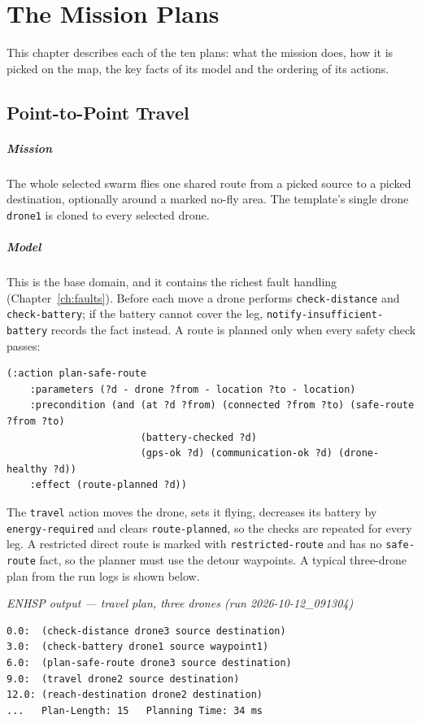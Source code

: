 \documentclass[11pt,a4paper,oneside]{report}
\newcommand{\code}[1]{\texttt{#1}}
\newcommand{\recordlabel}[1]{\par\smallskip\noindent\hspace*{1.2em}\textit{#1}\par}
\begin{document}
\chapter{The Mission Plans}\label{ch:plans}
This chapter describes each of the ten plans: what the mission does, how it is picked on the map,
the key facts of its model and the ordering of its actions.

\section{Point-to-Point Travel}
\paragraph{Mission}
The whole selected swarm flies one shared route from a picked source to a picked destination,
optionally around a marked no-fly area. The template's single drone \code{drone1} is cloned to
every selected drone.

\paragraph{Model}
This is the base domain, and it contains the richest fault handling (Chapter~\ref{ch:faults}).
Before each move a drone performs \code{check-distance} and \code{check-battery}; if the battery
cannot cover the leg, \code{notify-insufficient-battery} records the fact instead. A route is
planned only when every safety check passes:

\begin{lstlisting}
(:action plan-safe-route
    :parameters (?d - drone ?from - location ?to - location)
    :precondition (and (at ?d ?from) (connected ?from ?to) (safe-route ?from ?to)
                       (battery-checked ?d)
                       (gps-ok ?d) (communication-ok ?d) (drone-healthy ?d))
    :effect (route-planned ?d))
\end{lstlisting}

\noindent The \code{travel} action moves the drone, sets it flying, decreases its battery by
\code{energy-required} and clears \code{route-planned}, so the checks are repeated for every leg.
A restricted direct route is marked with \code{restricted-route} and has no \code{safe-route}
fact, so the planner must use the detour waypoints. A typical three-drone plan from the run logs
is shown below.

\recordlabel{ENHSP output --- travel plan, three drones (run 2026-10-12\_091304)}
\begin{lstlisting}[style=plain]
0.0:  (check-distance drone3 source destination)
3.0:  (check-battery drone1 source waypoint1)
6.0:  (plan-safe-route drone3 source destination)
9.0:  (travel drone2 source destination)
12.0: (reach-destination drone2 destination)
...   Plan-Length: 15   Planning Time: 34 ms
\end{lstlisting}
\end{document}
